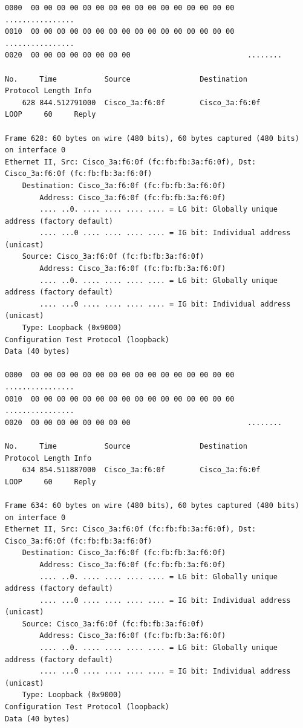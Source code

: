 \documentclass[a4paper,11pt]{article}
\begin{document}
\begin{lstlisting}
0000  00 00 00 00 00 00 00 00 00 00 00 00 00 00 00 00   ................
0010  00 00 00 00 00 00 00 00 00 00 00 00 00 00 00 00   ................
0020  00 00 00 00 00 00 00 00                           ........

No.     Time           Source                Destination           Protocol Length Info
    628 844.512791000  Cisco_3a:f6:0f        Cisco_3a:f6:0f        LOOP     60     Reply

Frame 628: 60 bytes on wire (480 bits), 60 bytes captured (480 bits) on interface 0
Ethernet II, Src: Cisco_3a:f6:0f (fc:fb:fb:3a:f6:0f), Dst: Cisco_3a:f6:0f (fc:fb:fb:3a:f6:0f)
    Destination: Cisco_3a:f6:0f (fc:fb:fb:3a:f6:0f)
        Address: Cisco_3a:f6:0f (fc:fb:fb:3a:f6:0f)
        .... ..0. .... .... .... .... = LG bit: Globally unique address (factory default)
        .... ...0 .... .... .... .... = IG bit: Individual address (unicast)
    Source: Cisco_3a:f6:0f (fc:fb:fb:3a:f6:0f)
        Address: Cisco_3a:f6:0f (fc:fb:fb:3a:f6:0f)
        .... ..0. .... .... .... .... = LG bit: Globally unique address (factory default)
        .... ...0 .... .... .... .... = IG bit: Individual address (unicast)
    Type: Loopback (0x9000)
Configuration Test Protocol (loopback)
Data (40 bytes)

0000  00 00 00 00 00 00 00 00 00 00 00 00 00 00 00 00   ................
0010  00 00 00 00 00 00 00 00 00 00 00 00 00 00 00 00   ................
0020  00 00 00 00 00 00 00 00                           ........

No.     Time           Source                Destination           Protocol Length Info
    634 854.511887000  Cisco_3a:f6:0f        Cisco_3a:f6:0f        LOOP     60     Reply

Frame 634: 60 bytes on wire (480 bits), 60 bytes captured (480 bits) on interface 0
Ethernet II, Src: Cisco_3a:f6:0f (fc:fb:fb:3a:f6:0f), Dst: Cisco_3a:f6:0f (fc:fb:fb:3a:f6:0f)
    Destination: Cisco_3a:f6:0f (fc:fb:fb:3a:f6:0f)
        Address: Cisco_3a:f6:0f (fc:fb:fb:3a:f6:0f)
        .... ..0. .... .... .... .... = LG bit: Globally unique address (factory default)
        .... ...0 .... .... .... .... = IG bit: Individual address (unicast)
    Source: Cisco_3a:f6:0f (fc:fb:fb:3a:f6:0f)
        Address: Cisco_3a:f6:0f (fc:fb:fb:3a:f6:0f)
        .... ..0. .... .... .... .... = LG bit: Globally unique address (factory default)
        .... ...0 .... .... .... .... = IG bit: Individual address (unicast)
    Type: Loopback (0x9000)
Configuration Test Protocol (loopback)
Data (40 bytes)


\end{lstlisting}
\end{document}
